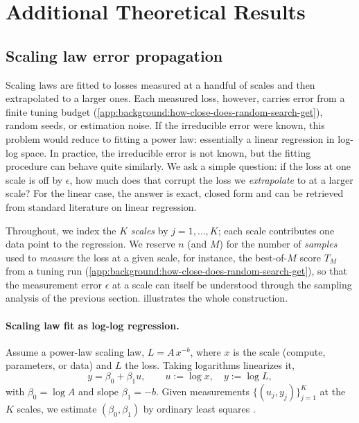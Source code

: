 \section{Additional Theoretical Results}
\label{app:additional-theoretical-results}


\subsection{Scaling law error propagation}
\label{sec:scaling-law-error-propagation}

Scaling laws are fitted to losses measured at a handful of scales and then extrapolated to a larger ones. Each measured loss, however, carries error from a finite tuning budget (\cref{app:background:how-close-does-random-search-get}), random seeds, or estimation noise. If the irreducible error were known, this problem would reduce to fitting a power law: essentially a linear regression in log-log space. In practice, the irreducible error is not known, but the fitting procedure can behave quite similarly. We ask a simple question: if the loss at one scale is off by $\epsilon$, how much does that corrupt the loss we \emph{extrapolate} to at a larger scale? For the linear case, the answer is exact, closed form and can be retrieved from standard literature on linear regression.

Throughout, we index the $K$ \emph{scales} by $j = 1, \dots, K$; each scale contributes one data point to the regression. We reserve $n$ (and $M$) for the number of \emph{samples} used to \emph{measure} the loss at a given scale, for instance, the best-of-$M$ score $T_M$ from a tuning run (\cref{app:background:how-close-does-random-search-get}), so that the measurement error $\epsilon$ at a scale can itself be understood through the sampling analysis of the previous section.  illustrates the whole construction.

\paragraph{Scaling law fit as log-log regression.}
Assume a power-law scaling law, $L = A\,x^{-b}$, where $x$ is the scale (compute, parameters, or data) and $L$ the loss. Taking logarithms linearizes it,
%
\begin{equation}\label{eq:loglog}
    y = \beta_0 + \beta_1 u, \qquad u := \log x, \quad y := \log L,
\end{equation}
%
with $\beta_0 = \log A$ and slope $\beta_1 = -b$. Given measurements $\{(u_j, y_j)\}_{j=1}^{K}$ at the $K$ scales, we estimate $(\beta_0, \beta_1)$ by ordinary least squares \citep{brook2018applied, montgomery2022introduction}.

